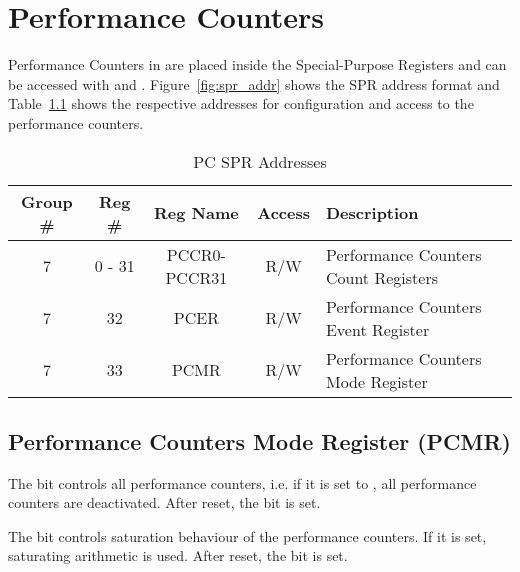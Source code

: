 \chapter{Performance Counters}
\label{chap:perf_count}

Performance Counters in \orion are placed inside the Special-Purpose Registers
and can be accessed with  and .
Figure~\ref{fig:spr_addr} shows the SPR address format and
Table~\ref{tab:pc_spr_addr} shows the respective addresses for configuration and
access to the performance counters.

\begin{table}[H]
 \caption{PC SPR Addresses}
 \label{tab:pc_spr_addr}
 \centering\begin{tabularx}{\textwidth}{@{}ccccX@{}} \toprule
   \textbf{Group \#} & \textbf{Reg \#} & Reg Name     & Access  & Description\\ \toprule
                   7 &  0 - 31         & PCCR0-PCCR31 & R/W     & Performance Counters Count Registers \\ \hline
                   7 &  32             & PCER         & R/W     & Performance Counters Event Register \\ \hline
                   7 &  33             & PCMR         & R/W     & Performance Counters Mode Register \\ \bottomrule
  \end{tabularx}
\end{table}


\section{Performance Counters Mode Register (PCMR)}


The  bit controls all performance counters, i.e. if it is set
to , all performance counters are deactivated.
After reset, the  bit is set.

The  bit controls saturation behaviour of the performance
counters. If it is set, saturating arithmetic is used.
After reset, the  bit is set.

